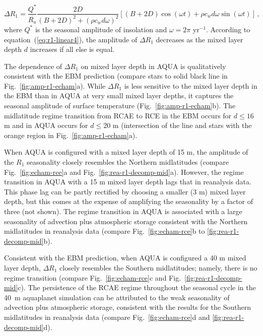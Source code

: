 \documentclass{ametsocV5}
\begin{document}
  \begin{equation} \label{eq:r1-linear4}
    \Delta R_{1} = \frac{Q^{*}}{\overline{R_{a}}}\frac{2D}{(B+2D)^{2}+(\rho c_w d \omega)^{2}}\left[(B+2D)\cos(\omega t)+\rho c_w d \omega \sin(\omega t)\right] \, ,
  \end{equation}
  where $Q^*$ is the seasonal amplitude of insolation and $\omega=2\pi$ yr$^{-1}$. According to equation~(\ref{eq:r1-linear4}), the amplitude of $\Delta R_1$ decreases as the mixed layer depth $d$ increases if all else is equal. 

  The dependence of $\Delta R_1$ on mixed layer depth in AQUA is qualitatively consistent with the EBM prediction (compare stars to solid black line in Fig.~\ref{fig:amp-r1-echam}a). While $\Delta R_1$ is less sensitive to the mixed layer depth in the EBM than in AQUA at very small mixed layer depths, it captures the seasonal amplitude of surface temperature (Fig.~\ref{fig:amp-r1-echam}b). The midlatitude regime transition from RCAE to RCE in the EBM occurs for $d \le 16$ m and in AQUA occurs for $d \le 20$ m (intersection of the line and stars with the orange region in Fig.~\ref{fig:amp-r1-echam}a).

  When AQUA is configured with a mixed layer depth of 15 m, the amplitude of the \(R_{1}\) seasonality closely resembles the Northern midlatitudes (compare Fig.~\ref{fig:echam-rce}a and Fig.~\ref{fig:rea-r1-decomp-mid}a). However, the regime transition in AQUA with a 15 m mixed layer depth lags that in reanalysis data. This phase lag can be partly rectified by choosing a smaller (3 m) mixed layer depth, but this comes at the expense of amplifying the seasonality by a factor of three (not shown). The regime transition in AQUA is associated with a large seasonality of advection plus atmospheric storage consistent with the Northern midlatitudes in reanalysis data (compare Fig.~\ref{fig:echam-rce}b to \ref{fig:rea-r1-decomp-mid}b). 
  
  Consistent with the EBM prediction, when AQUA is configured a 40 m mixed layer depth, \(\Delta R_{1}\) closely resembles the Southern midlatitudes; namely, there is no regime transition (compare Fig.~\ref{fig:echam-rce}c and Fig.~\ref{fig:rea-r1-decomp-mid}c). The persistence of the RCAE regime throughout the seasonal cycle in the 40~m aquaplanet simulation can be attributed to the weak seasonality of advection plus atmospheric storage, consistent with the results for the Southern midlatitudes in reanalysis data (compare Fig.~\ref{fig:echam-rce}d and \ref{fig:rea-r1-decomp-mid}d).
\end{document}

